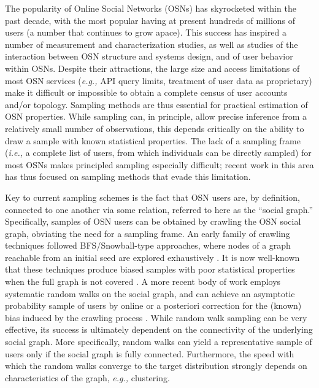 \documentclass[10pt, conference]{./IEEEtran}
\newcommand{\ie}{{\em i.e., }}
\newcommand{\eg}{{\em e.g., }}
\begin{document}
%
%
The popularity of Online Social Networks (OSNs) has skyrocketed within the past decade, with the most popular having at present hundreds of millions of users (a number that continues to grow apace). This success has inspired a number of measurement and characterization studies, as well as studies of the interaction between OSN structure and systems design, and of user behavior within OSNs.  Despite their attractions, the large size and access limitations of most OSN services (\eg API query limits, treatment of user data as proprietary) make it difficult or impossible to obtain a complete census of user accounts and/or topology.  Sampling methods are thus essential for practical estimation of OSN properties.  While sampling can, in principle, allow precise inference from a relatively small number of observations, this depends critically on the ability to draw a sample with known statistical properties.
%
The lack of a sampling frame (\ie a complete list of users, from which individuals can be directly sampled) for most OSNs makes principled sampling especially difficult; recent work in this area has thus focused on sampling methods that evade this limitation.

%
Key to current sampling schemes is the fact that OSN users are, by definition, connected to one another via some relation, referred to here as the ``social graph.''  Specifically, samples of OSN users can be obtained by crawling the OSN social graph, obviating the need for a sampling frame.  An early family of crawling techniques followed BFS/Snowball-type approaches, where nodes of a graph reachable from an initial seed are explored exhaustively \cite{Ahn-WWW-07, Mislove2007, Wilson09}. It is now well-known that these techniques produce biased samples with poor statistical properties when the full graph is not
covered
%
\cite{Lee-Phys-Rev-06, Kurant2010, Gjoka2010}.  A more recent body of work employs systematic random walks on the social graph, and can achieve an asymptotic probability sample of users by online or a posteriori correction for the (known) bias induced by the crawling process \cite{Gjoka2010,Rasti2008}.  While random walk sampling can be very effective, its success is ultimately dependent on the connectivity of the underlying social graph.  More specifically, random walks can yield a representative sample of users only if the social graph is fully connected.  Furthermore, the speed with which the random walks converge to the target distribution strongly depends on characteristics of the graph, \eg clustering.
%
%
%
\end{document}
